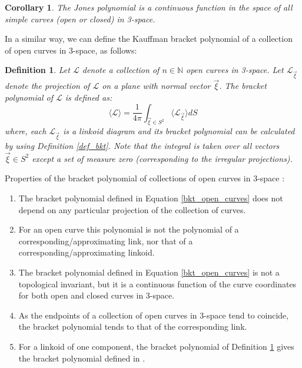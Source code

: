 \documentclass{article}
\newtheorem{definition}{Definition}[section]
\newtheorem{corollary}{Corollary}[section]
\begin{document}
\begin{corollary}
The Jones polynomial is a continuous function in the space of all simple curves (open or closed) in 3-space.
\end{corollary}


In a similar way, we can define the Kauffman bracket polynomial of a collection of open curves in 3-space, as follows:

\begin{definition}\label{bracket3d}
Let $\mathcal{L}$ denote a collection of $n \in \mathbb{N}$ open curves in 3-space. Let $\mathcal{L}_{\vec{\xi}}$ denote the projection of $\mathcal{L}$ on a plane with normal vector $\vec{\xi}$. The bracket polynomial of $\mathcal{L}$ is defined as:
 \begin{equation}
 \langle \mathcal{L} \rangle = \frac{1}{4\pi}\int_{\vec{\xi}\in S^2} \langle \mathcal{L}_{\vec{\xi}} \rangle dS
    \label{bkt_open_curves}
\end{equation}
where, each $\mathcal{L}_{\vec{\xi}}$ is a linkoid diagram and its bracket polynomial can be calculated by using Definition \ref{def_bkt}. Note that the integral is taken over all vectors $\vec{\xi} \in S^2$ except a set of measure zero (corresponding to the irregular projections).
\end{definition}

\noindent Properties of the bracket polynomial of collections of open curves in 3-space :

\begin{enumerate}
    \item The bracket polynomial defined in Equation \ref{bkt_open_curves} does not depend on any particular projection of the collection of curves.
    \item For an open curve this polynomial is not the polynomial of a corresponding/approximating
link, nor that of a corresponding/approximating linkoid.
    \item The bracket polynomial defined in Equation \ref{bkt_open_curves} is not a topological invariant, but it is a continuous function of the curve coordinates for both open and closed curves in 3-space.
    \item As the endpoints of a collection of open curves in 3-space tend to coincide, the bracket polynomial tends to that of the corresponding link.
    \item For a linkoid of one component, the bracket polynomial of Definition \ref{bracket3d} gives the bracket polynomial defined in \cite{Panagiotou2020b}.

\end{enumerate}
\end{document}
